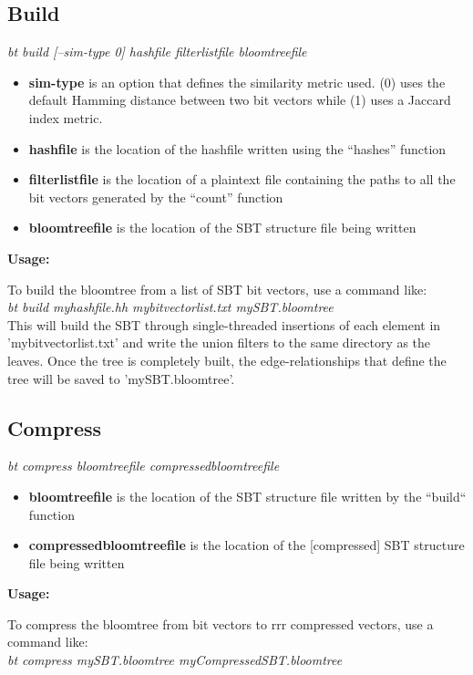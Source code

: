 \documentclass{article}
\begin{document}
\subsection{Build}
\textit{bt build [--sim-type 0] hashfile filterlistfile bloomtreefile}
\begin{itemize}
\item \textbf{sim-type} is an option that defines the similarity metric used. (0) uses the default Hamming distance between two bit vectors while (1) uses a Jaccard index metric.
\item \textbf{hashfile} is the location of the hashfile written using the ``hashes'' function
\item \textbf{filterlistfile} is the location of a plaintext file containing the paths to all the bit vectors generated by the ``count'' function
\item \textbf{bloomtreefile} is the location of the SBT structure file being written
\end{itemize}
\textbf{Usage:}

To build the bloomtree from a list of SBT bit vectors, use a command like: \\

\textit{bt build myhashfile.hh mybitvectorlist.txt mySBT.bloomtree} \\

This will build the SBT through single-threaded insertions of each element in 'mybitvectorlist.txt' and write the union filters to the same directory as the leaves. Once the tree is completely built, the edge-relationships that define the tree will be saved to 'mySBT.bloomtree'.

\subsection{Compress}
\textit{bt compress bloomtreefile compressedbloomtreefile}
\begin{itemize}
\item \textbf{bloomtreefile} is the location of the SBT structure file written by the ``build`` function
\item \textbf{compressedbloomtreefile} is the location of the [compressed] SBT structure file being written
\end{itemize}
\textbf{Usage:}

To compress the bloomtree from bit vectors to rrr compressed vectors, use a command like: \\

\textit{bt compress mySBT.bloomtree myCompressedSBT.bloomtree} \\
\end{document}
